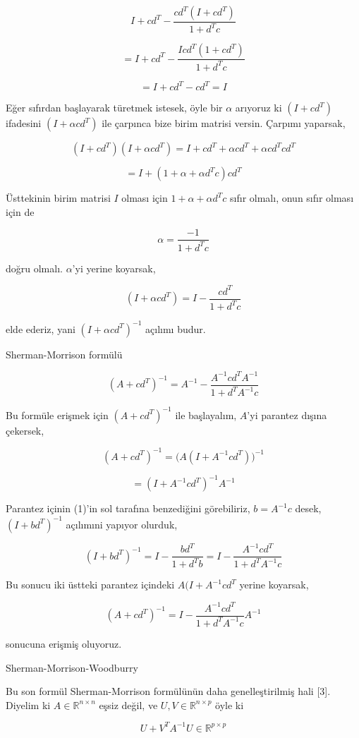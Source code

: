 \documentclass[12pt,fleqn]{article}\usepackage{../../common}
\begin{document}
$$
I + cd^T - \frac{cd^T (I + cd^T)}{1+d^Tc}
$$

$$
= I + cd^T - \frac{I cd^T (1+cd^T)}{1+d^Tc}
$$

$$
= I + cd^T - cd^T = I
$$

Eğer sıfırdan başlayarak türetmek istesek, öyle bir $\alpha$ arıyoruz ki
$(I + cd^T)$ ifadesini $(I + \alpha cd^T)$ ile çarpınca bize birim matrisi
versin. Çarpımı yaparsak,

$$
(I + cd^T) (I + \alpha cd^T) = I + cd^T + \alpha cd^T + \alpha cd^Tcd^T 
$$

$$
= I + (1 + \alpha + \alpha d^T c) cd^T
$$

Üsttekinin birim matrisi $I$ olması için $1 + \alpha + \alpha d^T c$ sıfır
olmalı, onun sıfır olması için de

$$\alpha = \frac{-1}{1 + d^Tc}$$

doğru olmalı. $\alpha$'yi yerine koyarsak, 

$$
(I + \alpha cd^T) = I - \frac{cd^T}{1+d^Tc}
$$

elde ederiz, yani $(I + \alpha cd^T)^{-1}$ açılımı budur. 

Sherman-Morrison formülü 

$$
(A + cd^T)^{-1} = A^{-1} - \frac{A^{-1} cd^T A^{-1} }{1 + d^TA^{-1}c}
$$

Bu formüle erişmek için $(A + cd^T)^{-1}$ ile başlayalım, $A$'yi parantez
dışına çekersek,

$$
(A + cd^T)^{-1} = \big( A ( I + A ^{-1} cd^T ) \big)^{-1} 
$$

$$
= ( I + A ^{-1} cd^T )^{-1} A^{-1} 
$$

Parantez içinin (1)'in sol tarafına benzediğini görebiliriz, $b = A^{-1}c$ 
desek,  $( I + bd^T )^{-1} $ açılımıni yapıyor olurduk, 

$$
( I + bd^T )^{-1} 
= I - \frac{bd^T}{1+d^Tb} 
= I - \frac{A^{-1}cd^T}{1+d^TA^{-1}c}
$$

Bu sonucu iki üstteki parantez içindeki $A ( I + A ^{-1} cd^T$ yerine
koyarsak,

$$
(A + cd^T)^{-1} = I - \frac{A^{-1}cd^T}{1+d^TA^{-1}c} A^{-1} 
$$

sonucuna erişmiş oluyoruz. 

Sherman-Morrison-Woodburry

Bu son formül Sherman-Morrison formülünün daha genelleştirilmiş hali
[3]. Diyelim ki $A \in \mathbb{R}^{n \times n}$ eşsiz değil, ve
$U,V \in \mathbb{R}^{n \times p}$ öyle ki 

$$
U + V^T A^{-1} U \in \mathbb{R}^{p \times p}
$$
\end{document}
